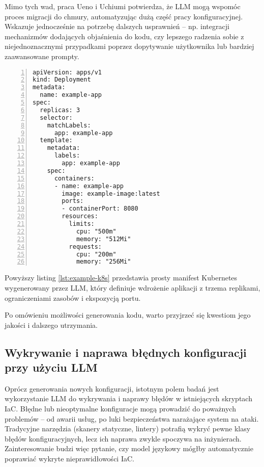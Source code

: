 Mimo tych wad, praca Ueno i Uchiumi potwierdza, że LLM mogą wspomóc proces migracji do chmury, automatyzując dużą część pracy konfiguracyjnej. Wskazuje jednocześnie na potrzebę dalszych usprawnień – np. integracji mechanizmów dodających objaśnienia do kodu, czy lepszego radzenia sobie z niejednoznacznymi przypadkami poprzez dopytywanie użytkownika lub bardziej zaawansowane prompty.

\begin{lstlisting}[caption={Manifest Kubernetes wygenerowany przez LLM},label={lst:example-k8s},captionpos=b,numbers=left]
apiVersion: apps/v1
kind: Deployment
metadata:
  name: example-app
spec:
  replicas: 3
  selector:
    matchLabels:
      app: example-app
  template:
    metadata:
      labels:
        app: example-app
    spec:
      containers:
      - name: example-app
        image: example-image:latest
        ports:
        - containerPort: 8080
        resources:
          limits:
            cpu: "500m"
            memory: "512Mi"
          requests:
            cpu: "200m"
            memory: "256Mi"
\end{lstlisting}

Powyższy listing \ref{lst:example-k8s} przedstawia prosty manifest Kubernetes wygenerowany przez LLM, który definiuje wdrożenie aplikacji z trzema replikami, ograniczeniami zasobów i ekspozycją portu.

Po omówieniu możliwości generowania kodu, warto przyjrzeć się kwestiom jego jakości i dalszego utrzymania.

\subsection{Wykrywanie i naprawa błędnych konfiguracji przy użyciu LLM}

Oprócz generowania nowych konfiguracji, istotnym polem badań jest wykorzystanie LLM do wykrywania i naprawy błędów w istniejących skryptach IaC. Błędne lub nieoptymalne konfiguracje mogą prowadzić do poważnych problemów – od awarii usług, po luki bezpieczeństwa narażające system na ataki. Tradycyjne narzędzia (skanery statyczne, lintery) potrafią wykryć pewne klasy błędów konfiguracyjnych, lecz ich naprawa zwykle spoczywa na inżynierach. Zainteresowanie budzi więc pytanie, czy model językowy mógłby automatycznie poprawiać wykryte nieprawidłowości IaC.

